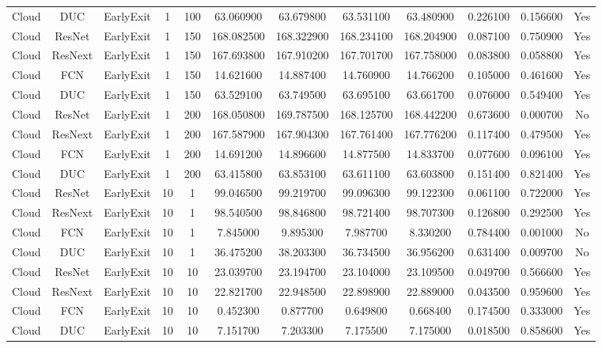 \begin{tabular}{|c||c||c||c||c||c||c||c||c||c||c||c|}
Cloud & DUC & EarlyExit & 1 & 100 & 63.060900 & 63.679800 & 63.531100 & 63.480900 & 0.226100 & 0.156600 & Yes \\
Cloud & ResNet & EarlyExit & 1 & 150 & 168.082500 & 168.322900 & 168.234100 & 168.204900 & 0.087100 & 0.750900 & Yes \\
Cloud & ResNext & EarlyExit & 1 & 150 & 167.693800 & 167.910200 & 167.701700 & 167.758000 & 0.083800 & 0.058800 & Yes \\
Cloud & FCN & EarlyExit & 1 & 150 & 14.621600 & 14.887400 & 14.760900 & 14.766200 & 0.105000 & 0.461600 & Yes \\
Cloud & DUC & EarlyExit & 1 & 150 & 63.529100 & 63.749500 & 63.695100 & 63.661700 & 0.076000 & 0.549400 & Yes \\
Cloud & ResNet & EarlyExit & 1 & 200 & 168.050800 & 169.787500 & 168.125700 & 168.442200 & 0.673600 & 0.000700 & No \\
Cloud & ResNext & EarlyExit & 1 & 200 & 167.587900 & 167.904300 & 167.761400 & 167.776200 & 0.117400 & 0.479500 & Yes \\
Cloud & FCN & EarlyExit & 1 & 200 & 14.691200 & 14.896600 & 14.877500 & 14.833700 & 0.077600 & 0.096100 & Yes \\
Cloud & DUC & EarlyExit & 1 & 200 & 63.415800 & 63.853100 & 63.611100 & 63.603800 & 0.151400 & 0.821400 & Yes \\
Cloud & ResNet & EarlyExit & 10 & 1 & 99.046500 & 99.219700 & 99.096300 & 99.122300 & 0.061100 & 0.722000 & Yes \\
Cloud & ResNext & EarlyExit & 10 & 1 & 98.540500 & 98.846800 & 98.721400 & 98.707300 & 0.126800 & 0.292500 & Yes \\
Cloud & FCN & EarlyExit & 10 & 1 & 7.845000 & 9.895300 & 7.987700 & 8.330200 & 0.784400 & 0.001000 & No \\
Cloud & DUC & EarlyExit & 10 & 1 & 36.475200 & 38.203300 & 36.734500 & 36.956200 & 0.631400 & 0.009700 & No \\
Cloud & ResNet & EarlyExit & 10 & 10 & 23.039700 & 23.194700 & 23.104000 & 23.109500 & 0.049700 & 0.566600 & Yes \\
Cloud & ResNext & EarlyExit & 10 & 10 & 22.821700 & 22.948500 & 22.898900 & 22.889000 & 0.043500 & 0.959600 & Yes \\
Cloud & FCN & EarlyExit & 10 & 10 & 0.452300 & 0.877700 & 0.649800 & 0.668400 & 0.174500 & 0.333000 & Yes \\
Cloud & DUC & EarlyExit & 10 & 10 & 7.151700 & 7.203300 & 7.175500 & 7.175000 & 0.018500 & 0.858600 & Yes \\

\end{tabular}
